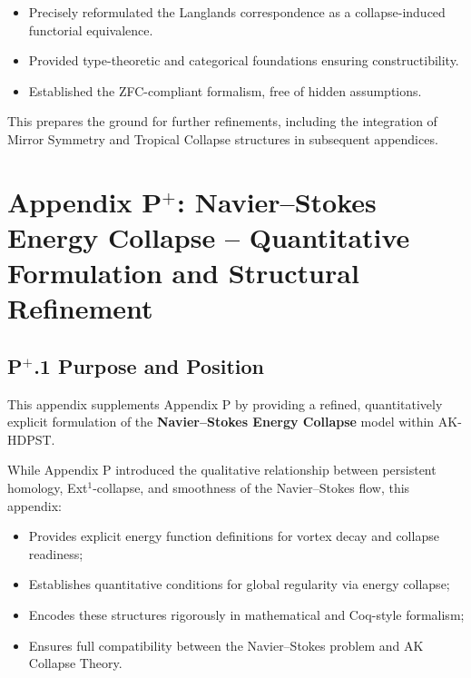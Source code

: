 \documentclass[11pt]{article}
\begin{document}
\begin{itemize}
  \item Precisely reformulated the Langlands correspondence as a collapse-induced functorial equivalence.
  \item Provided type-theoretic and categorical foundations ensuring constructibility.
  \item Established the ZFC-compliant formalism, free of hidden assumptions.
\end{itemize}

This prepares the ground for further refinements, including the integration of Mirror Symmetry and Tropical Collapse structures in subsequent appendices.




\section*{Appendix P$^{+}$: Navier–Stokes Energy Collapse – Quantitative Formulation and Structural Refinement}

\subsection*{P$^{+}$.1 Purpose and Position}

This appendix supplements Appendix P by providing a refined, quantitatively explicit formulation of the \textbf{Navier–Stokes Energy Collapse} model within AK-HDPST.

While Appendix P introduced the qualitative relationship between persistent homology, Ext$^1$-collapse, and smoothness of the Navier–Stokes flow, this appendix:

\begin{itemize}
    \item Provides explicit energy function definitions for vortex decay and collapse readiness;
    \item Establishes quantitative conditions for global regularity via energy collapse;
    \item Encodes these structures rigorously in mathematical and Coq-style formalism;
    \item Ensures full compatibility between the Navier–Stokes problem and AK Collapse Theory.
\end{itemize}
\end{document}

